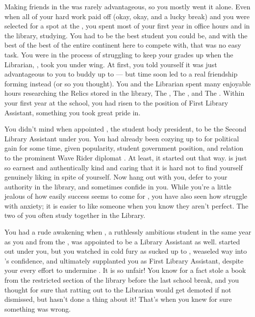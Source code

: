 \documentclass[char]{GL2020}
\begin{document}
Making friends in the \pFarm{} was rarely advantageous, so you mostly went it alone. Even when all of your hard work paid off (okay, okay, and a lucky break) and you were selected for a spot at the \pSchool{}, you spent most of your first year in office hours and in the library, studying. You had to be the best student you could be, and with the best of the best of the entire continent here to compete with, that was no easy task. You were in the process of struggling to keep your grades up when the Librarian, \cLibrarian{\full}, took you under \cLibrarian{\their} wing. At first, you told yourself it was just advantageous to you to buddy up to \cLibrarian{\them} — but time soon led to a real friendship forming instead (or so you thought). You and the Librarian spent many enjoyable hours researching the Relics stored in the library, The \iLariat{}, The \iNet{}, and The \iScythe{}. Within your first year at the school, you had risen to the position of First Library Assistant, something you took great pride in.

You didn't mind when \cLibrarian{} appointed \cPresident{\full}, the student body president, to be the Second Library Assistant under you. You had already been cozying up to \cPresident{} for political gain for some time, given \cPresident{\their} popularity, student government position, and relation to the prominent Wave Rider diplomat \cHeadDiplomat{\full}. At least, it started out that way. \cPresident{} is just so earnest and authentically kind and caring that it is hard not to find yourself genuinely liking \cPresident{\them} in spite of yourself. Now \cPresident{\they} hang\cPresident{\verbs} out with you, defer\cPresident{\verbs} to your authority in the library, and sometimes confide\cPresident{\verbs} in you. While you're a little jealous of how easily success seems to come for \cPresident{}, you have also seen how \cPresident{\they} struggle\cPresident{\verbs} with anxiety; it is easier to like someone when you know they aren't perfect. The two of you often study together in the Library.

You had a rude awakening when \cAmbition{\full}, a ruthlessly ambitious student in the same year as you and from the \pTech{}, was appointed to be a Library Assistant as well. \cAmbition{\They} started out under you, but you watched in cold fury as \cAmbition{\they} sucked up to \cLibrarian{}, weaseled \cAmbition{\their} way into \cLibrarian{}’s confidence, and ultimately supplanted you as First Library Assistant, despite your every effort to undermine \cAmbition{\them}. It is so unfair! You know for a fact \cAmbition{} stole a book from the restricted section of the library before the last school break, and you thought for sure that ratting \cAmbition{\them} out to the Librarian would get \cAmbition{\them} demoted if not dismissed, but \cLibrarian{} hasn't done a thing about it! That's when you knew for sure something was wrong. 
\end{document}
